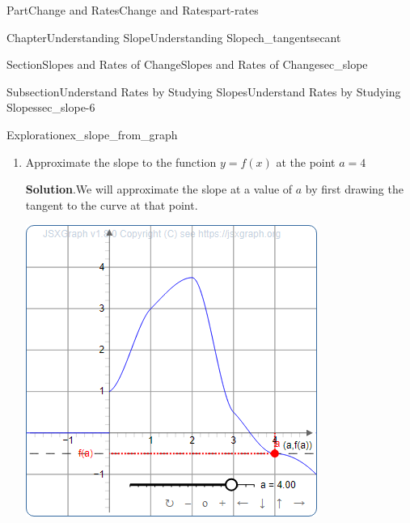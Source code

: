 \documentclass{tufte-book}
\newcommand{\blocktitlefont}{\relax}
\numberwithin{equation}{chapter}
\begin{document}
\begin{partptx}{Part}{Change and Rates}{}{Change and Rates}{}{}{part-rates}
\begin{chapterptx}{Chapter}{Understanding Slope}{}{Understanding Slope}{}{}{ch_tangentsecant}
\begin{sectionptx}{Section}{Slopes and Rates of Change}{}{Slopes and Rates of Change}{}{}{sec_slope}
\begin{subsectionptx}{Subsection}{Understand Rates by Studying Slopes}{}{Understand Rates by Studying Slopes}{}{}{sec_slope-6}
\begin{exploration}{Exploration}{}{ex_slope_from_graph}
\begin{enumerate}[font=\bfseries,label=(\alph*),ref=\alph*]
\begin{equation*}
m = \dfrac{0.5-3.5}{3-0} = \dfrac{-3}{3} = -1
\end{equation*}
Therefore, the slope of \(f(x)\) at \(a=3\) is equal to -1.%
\item{}Approximate the slope to the function \(y=f(x)\) at the point \(a=4\)%
\par\smallskip%
\noindent\textbf{\blocktitlefont Solution}.\hypertarget{ex_slope_from_graph-5-2}{}\quad{}We will approximate the slope at a value of \(a\) by first drawing the tangent to the curve at that point.%
\begin{sidebyside}{2}{0.075}{0.075}{0.17}%
\begin{sbspanel}{0.47}%
\includegraphics[width=\linewidth]{generated/preview/ex_slope_from_graph-5-2-2-preview.png}
\end{sbspanel}%
\begin{sbspanel}{0.21}%

\end{sbspanel}
\end{sidebyside}
\end{enumerate}
\end{exploration}
\end{subsectionptx}
\end{sectionptx}
\end{chapterptx}
\end{partptx}
\end{document}
